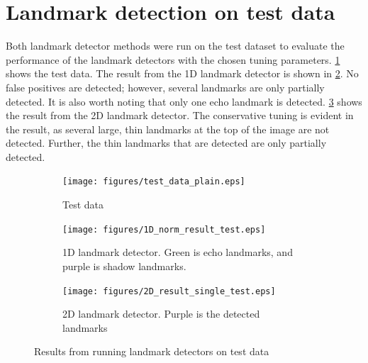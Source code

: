 \newpage

\section{Landmark detection on test data}

Both landmark detector methods were run on the test dataset to evaluate the performance of the landmark detectors with the chosen tuning parameters. \cref{fig:test_data} shows the test data. The result from the 1D landmark detector is shown in \cref{fig:1D_norm_result_test}. No false positives are detected; however, several landmarks are only partially detected. It is also worth noting that only one echo landmark is detected. \cref{fig:2D_result_single_test} shows the result from the 2D landmark detector. The conservative tuning is evident in the result, as several large, thin landmarks at the top of the image are not detected. Further, the thin landmarks that are detected are only partially detected. 

\begin{figure} %
     \centering
    \begin{subfigure}[t]{0.66\textwidth}
         \centering
         \texttt{[image: figures/test\_data\_plain.eps]}
         \caption{Test data}
         \label{fig:test_data}
     \end{subfigure}
     \hfill
     \begin{subfigure}[b]{0.45\textwidth}
         \centering
         \texttt{[image: figures/1D\_norm\_result\_test.eps]}
         \caption{1D landmark detector. Green is echo landmarks, and purple is shadow landmarks.}
         \label{fig:1D_norm_result_test}
     \end{subfigure}
     \hfill
     \begin{subfigure}[b]{0.45\textwidth}
         \centering
         \texttt{[image: figures/2D\_result\_single\_test.eps]}
         \caption{2D landmark detector. Purple is the detected landmarks}
         \label{fig:2D_result_single_test}
     \end{subfigure}
        \caption{Results from running landmark detectors on test data}
        \label{fig:landmark_detection_test_data}
\end{figure}
